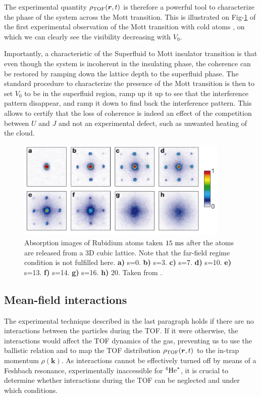 The experimental quantity $\rho_{\rm{TOF}}(\bm{r},t)$ is therefore a powerful tool to characterize the phase of the system across the Mott transition. This is illustrated on Fig-\ref{fig:mott_greiner} of the first experimental observation of the Mott transition with cold atoms \cite{greiner2002quantum}, on which we can clearly see the visibility decreasing with $V_0$.

Importantly, a characteristic of the Superfluid to Mott insulator transition is that even though the system is incoherent in the insulating phase, the coherence can be restored by ramping down the lattice depth to the superfluid phase. The standard procedure to characterize the presence of the Mott transition is then to set $V_0$ to be in the superfluid region, ramp up it up to see that the interference pattern disappear, and ramp it down to find back the interference pattern. This allows to certify that the loss of coherence is indeed an effect of the competition between $U$ and $J$ and not an experimental defect, such as unwanted heating of the cloud. 

\begin{figure}
    \centering
    \includegraphics[width=0.9\textwidth]{Fig/Chapter2/mott_greiner.png}
    \caption{Absorption images of Rubidium atoms taken $15 \ \rm{ms}$ after the atoms are released from a 3D cubic lattice. Note that the far-field regime condition is not fulfilled here. \textbf{a)} s=0. \textbf{b)} s=3. \textbf{c)} s=7. \textbf{d)} s=10. \textbf{e)} s=13. \textbf{f)} s=14. \textbf{g)} s=16. \textbf{h)} 20. Taken from \cite{greiner2002quantum}.}
    \label{fig:mott_greiner}
\end{figure}


\subsection{Mean-field interactions}

The experimental technique described in the last paragraph holds if there are no interactions between the particles during the TOF. If it were otherwise, the interactions would affect the TOF dynamics of the gas, preventing us to use the ballistic relation and to map the TOF distribution $\rho_{\rm{TOF}}(\bm{r},t)$ to the in-trap momentum $\rho(\bm{k})$. As interactions cannot be effectively turned off by means of a Feshbach resonance, experimentally inaccessible for $^4 \mathrm{He}^*$, it is crucial to determine whether interactions during the TOF can be neglected and under which conditions.

